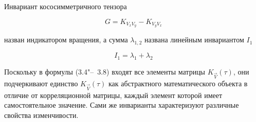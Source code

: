 Инвариант кососимметричного тензора

\begin{equation}
\label{eq:equation3_7}
G=K_{{V_{x}V_{y}}}-K_{{V_{y}V_{x}}}
\end{equation} 

назван индикатором вращения, а сумма $\lambda_{1,2}$ названа линейным инвариантом $I_1$ 

\begin{equation}
\label{eq:equation3_8}
I_1=\lambda_{1}+\lambda_{2}
\end{equation}

Поскольку в формулы (3.4"--~3.8) входят все элементы матрицы $K_{\vec{V}}(\tau)$, они подчеркивают единство $K_{\vec{V}}(\tau)$ как абстрактного математического объекта в отличие от корреляционной матрицы, каждый элемент которой имеет самостоятельное значение. Сами же инварианты характеризуют различные свойства изменчивости.
